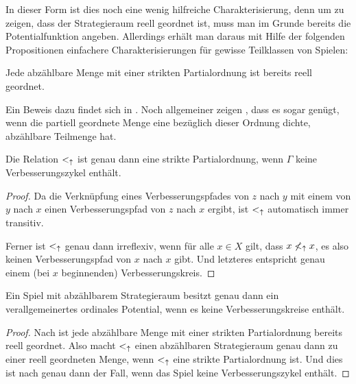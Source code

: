 In dieser Form ist dies noch eine wenig hilfreiche Charakterisierung, denn um zu zeigen, dass der Strategieraum reell geordnet ist, muss man im Grunde bereits die Potentialfunktion angeben. Allerdings erhält man daraus mit Hilfe der folgenden Propositionen einfachere Charakterisierungen für gewisse Teilklassen von Spielen:

\begin{prop}\label{prop:AbzReellGeordnet}
	Jede abzählbare Menge mit einer strikten Partialordnung ist bereits reell geordnet.
\end{prop}

Ein Beweis dazu findet sich in \cite[Lemma 2.2]{CharExOrdPot}. Noch allgemeiner zeigen \citeauthor{CharExOrdPot}, dass es sogar genügt, wenn die partiell geordnete Menge eine bezüglich dieser Ordnung dichte, abzählbare Teilmenge hat.

\begin{prop}\label{prop:VerRelPartOrdVerbz}
	Die Relation $<_\uparrow$ ist genau dann eine strikte Partialordnung, wenn $\Gamma$ keine Verbesserungszykel enthält.
\end{prop}

\begin{proof}
	Da die Verknüpfung eines Verbesserungspfades von $z$ nach $y$ mit einem von $y$ nach $x$ einen Verbesserungspfad von $z$ nach $x$ ergibt, ist $<_\uparrow$ automatisch immer transitiv.
	
	Ferner ist $<_\uparrow$ genau dann irreflexiv, wenn für alle $x \in X$ gilt, dass $x \not<_\uparrow x$, es also keinen Verbesserungspfad von $x$ nach $x$ gibt. Und letzteres entspricht genau einem (bei $x$ beginnenden) Verbesserungskreis.
\end{proof}

\begin{kor}\label{kor:CharExVerOrdPotabzX}
	Ein Spiel mit abzählbarem Strategieraum besitzt genau dann ein verallgemeinertes ordinales Potential, wenn es keine Verbesserungskreise enthält.
\end{kor}

\begin{proof}
	Nach  ist jede abzählbare Menge mit einer strikten Partialordnung bereits reell geordnet. Also macht $<_\uparrow$ einen abzählbaren Strategieraum genau dann zu einer reell geordneten Menge, wenn $<_\uparrow$ eine strikte Partialordnung ist. Und dies ist nach  genau dann der Fall, wenn das Spiel keine Verbesserungszykel enthält.
\end{proof}

